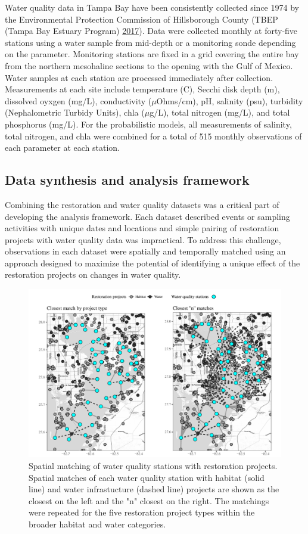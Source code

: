 \documentclass[]{article}
\begin{document}
Water quality data in Tampa Bay have been consistently collected since
1974 by the Environmental Protection Commission of Hillsborough County
(TBEP (Tampa Bay Estuary Program) \protect\hyperlink{ref-TBEP17}{2017}).
Data were collected monthly at forty-five stations using a water sample
from mid-depth or a monitoring sonde depending on the parameter.
Monitoring stations are fixed in a grid covering the entire bay from the
northern mesohaline sections to the opening with the Gulf of Mexico.
Water samples at each station are processed immediately after
collection. Measurements at each site include temperature (C), Secchi
disk depth (m), dissolved oyxgen (mg/L), conductivity (\(\mu\)Ohms/cm),
pH, salinity (psu), turbidity (Nephalometric Turbidy Units), \ac{chla}
(\(\mu\)g/L), total nitrogen (mg/L), and total phosphorus (mg/L). For
the probabilistic models, all measurements of salinity, total nitrogen,
and \ac{chla} were combined for a total of 515 monthly observations of
each parameter at each station.

\subsection{Data synthesis and analysis
framework}\label{data-synthesis-and-analysis-framework}

Combining the restoration and water quality datasets was a critical part
of developing the analysis framework. Each dataset described events or
sampling activities with unique dates and locations and simple pairing
of restoration projects with water quality data was impractical. To
address this challenge, observations in each dataset were spatially and
temporally matched using an approach designed to maximize the potential
of identifying a unique effect of the restoration projects on changes in
water quality.

\begin{figure}
\includegraphics[width=\textwidth]{figs/spmtch-1} \caption{Spatial matching of water quality stations with restoration projects. Spatial matches of each water quality station with habitat (solid line) and water infrastucture (dashed line) projects are shown as the closest on the left and the "n" closest on the right.  The matchings were repeated for the five restoration project types within the broader habitat and water categories.}\label{fig:spmtch}
\end{figure}
\end{document}
